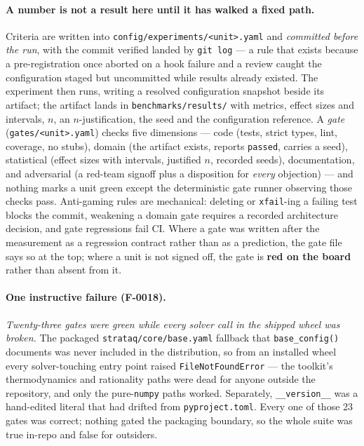 \paragraph{A number is not a result here until it has walked a fixed path.}
Criteria are written into \texttt{config/experiments/<unit>.yaml} and
\emph{committed before the run}, with the commit verified landed by
\texttt{git log} --- a rule that exists because a pre-registration once aborted on
a hook failure and a review caught the configuration staged but uncommitted while
results already existed. The experiment then runs, writing a resolved
configuration snapshot beside its artifact; the artifact lands in
\texttt{benchmarks/results/} with metrics, effect sizes and intervals, $n$, an
$n$-justification, the seed and the configuration reference. A \emph{gate}
(\texttt{gates/<unit>.yaml}) checks five dimensions --- code (tests, strict types,
lint, coverage, no stubs), domain (the artifact exists, reports \texttt{passed},
carries a seed), statistical (effect sizes with intervals, justified $n$, recorded
seeds), documentation, and adversarial (a red-team signoff plus a disposition for
\emph{every} objection) --- and nothing marks a unit green except the
deterministic gate runner observing those checks pass. Anti-gaming rules are
mechanical: deleting or \texttt{xfail}-ing a failing test blocks the commit,
weakening a domain gate requires a recorded architecture decision, and gate
regressions fail CI. Where a gate was written after the measurement as a
regression contract rather than as a prediction, the gate file says so at the top;
where a unit is not signed off, the gate is \textbf{red on the board} rather than
absent from it.

\paragraph{One instructive failure (F-0018).} \emph{Twenty-three gates were green
while every solver call in the shipped wheel was broken.} The packaged
\texttt{strataq/core/base.yaml} fallback that \texttt{base\_config()} documents
was never included in the distribution, so from an installed wheel every
solver-touching entry point raised \texttt{FileNotFoundError} --- the toolkit's
thermodynamics and rationality paths were dead for anyone outside the repository,
and only the pure-\texttt{numpy} paths worked. Separately,
\texttt{\_\_version\_\_} was a hand-edited literal that had drifted from
\texttt{pyproject.toml}. Every one of those 23 gates was correct; nothing gated
the packaging boundary, so the whole suite was true in-repo and false for
outsiders.

